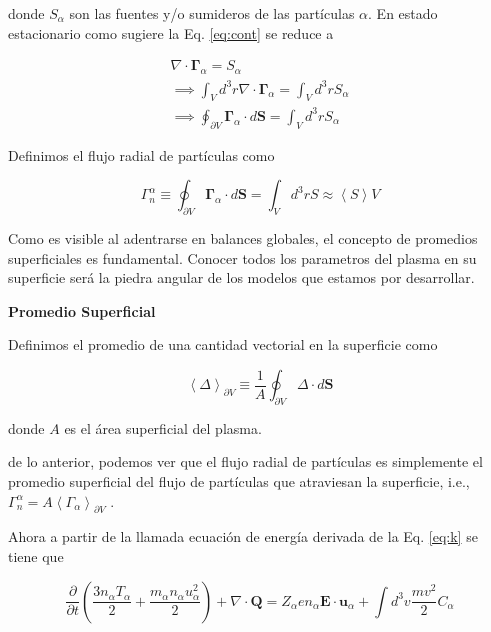 \documentclass[11pt]{article}
\theoremstyle{definition}
\begin{document}
  donde $S_\alpha$ son las fuentes y/o sumideros de las part\'iculas $\alpha$. En estado estacionario como sugiere \cite{lechte2002} la Eq. \eqref{eq:cont} se reduce a 

  \begin{eqnarray*}
    \nabla\cdot\pmb{\Gamma}_\alpha = S_\alpha \\
    \implies \int_V d^3r\nabla\cdot\pmb{\Gamma}_\alpha = \int_V d^3r S_\alpha\\
    \implies \oint_{\partial V} \pmb{\Gamma}_\alpha\cdot d\textbf{S} = \int_V d^3r S_\alpha
  \end{eqnarray*}

  Definimos el flujo radial de part\'iculas como

  \begin{equation}\label{eq:rtpf}
    \Gamma_n^\alpha \equiv \oint_{\partial V} \pmb{\Gamma}_\alpha \cdot d\textbf{S} = \int_V d^3r S \approx \left<S\right>V
  \end{equation}

  Como es visible al adentrarse en balances globales, el concepto de promedios superficiales es fundamental. Conocer todos los parametros del plasma en su superficie ser\'a la piedra angular de los modelos que estamos por desarrollar.

  \begin{shaded}
    \textbf{Promedio Superficial}

    Definimos el promedio de una cantidad vectorial en la superficie como 

    \begin{equation}
      \left<\pmb{\varDelta}\right>_{\partial V} \equiv \frac{1}{A}\oint_{\partial V}\pmb{\varDelta}\cdot d\textbf{S}
    \end{equation}

    donde $A$ es el \'area superficial del plasma.
  \end{shaded}

  de lo anterior, podemos ver que el flujo radial de part\'iculas es simplemente el promedio superficial del flujo de part\'iculas que atraviesan la superficie, i.e., $\Gamma_n^\alpha = A\left<\Gamma_\alpha\right>_{\partial V}$ \cite{dinklage2005}.
  
  Ahora a partir de la llamada ecuaci\'on de energ\'ia \cite{helander2005} derivada de la Eq. \eqref{eq:k} se tiene que

  \begin{equation}\label{eq:energy}
    \frac{\partial}{\partial t}\left(\frac{3n_\alpha T_\alpha}{2} + \frac{m_\alpha n_\alpha u_\alpha^2}{2}\right) + \nabla\cdot\textbf{Q} = Z_\alpha e n_\alpha \textbf{E}\cdot\textbf{u}_\alpha + \int d^3v\frac{mv^2}{2}C_\alpha
  \end{equation} 
\end{document}
